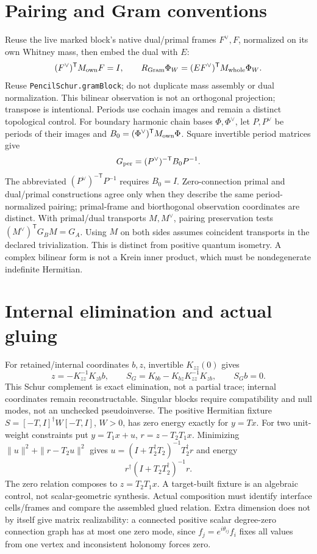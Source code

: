 \documentclass[11pt]{article}
\theoremstyle{definition}
\theoremstyle{remark}
\begin{document}
\section{Pairing and Gram conventions}\label{sec:gram-contract}

Reuse the live marked block's native dual/primal frames $F^\vee,F$,
normalized on its own Whitney mass, then embed the dual with $E$:
\[
 (F^\vee)^{\mathsf T}M_{\rm own}F=I,\qquad
 R_{\rm Gram}\Phi_W=(EF^\vee)^{\mathsf T}M_{\rm whole}\Phi_W .
\]
Reuse \texttt{PencilSchur.gramBlock}; do not duplicate mass assembly or
dual normalization. This bilinear observation is not an orthogonal
projection; transpose is intentional. Periods use cochain images and
remain a distinct topological control.
For boundary harmonic chain bases $\Phi,\Phi^\vee$, let $P,P^\vee$ be
periods of their images and $B_0=(\Phi^\vee)^{\mathsf T}M_{\rm own}\Phi$.
Square invertible period matrices give
\[
 G_{\rm per}=(P^\vee)^{-\mathsf T}B_0P^{-1}.
\]
The abbreviated $(P^\vee)^{-\mathsf T}P^{-1}$ requires $B_0=I$.
Zero-connection primal and dual/primal constructions agree only when they
describe the same period-normalized pairing; primal-frame and biorthogonal
observation coordinates are distinct.
With primal/dual transports $M,M^\vee$, pairing preservation tests
$(M^\vee)^{\mathsf T}G_BM=G_A$. Using $M$ on both sides assumes coincident
transports in the declared trivialization.
This is distinct from positive quantum isometry. A complex bilinear form
is not a Krein inner product, which must be nondegenerate indefinite
Hermitian.

\section{Internal elimination and actual gluing}\label{sec:elimination}

For retained/internal coordinates $b,z$, invertible $K_{zz}(0)$ gives
\[
 z=-K_{zz}^{-1}K_{zb}b,\qquad
 S_G=K_{bb}-K_{bz}K_{zz}^{-1}K_{zb},\qquad S_Gb=0.
\]
This Schur complement is exact elimination, not a partial trace; internal
coordinates remain reconstructable. Singular blocks require compatibility
and null modes, not an unchecked pseudoinverse. The positive Hermitian
fixture $S=[-T,I]^\dagger W[-T,I]$, $W>0$, has zero energy exactly for $y=Tx$.
For two unit-weight constraints put $y=T_1x+u$, $r=z-T_2T_1x$.
Minimizing $\|u\|^2+\|r-T_2u\|^2$ gives
$u=(I+T_2^\dagger T_2)^{-1}T_2^\dagger r$ and energy
\[
 r^\dagger(I+T_2T_2^\dagger)^{-1}r .
\]
The zero relation composes to $z=T_2T_1x$. A target-built fixture is an
algebraic control, not scalar-geometric synthesis. Actual composition must
identify interface cells/frames and compare the assembled glued relation.
Extra dimension does not by itself give matrix realizability: a connected
positive scalar degree-zero connection graph has at most one zero mode,
since $f_j=e^{i\theta_{ij}}f_i$ fixes all values from one vertex and
inconsistent holonomy forces zero.
\end{document}
